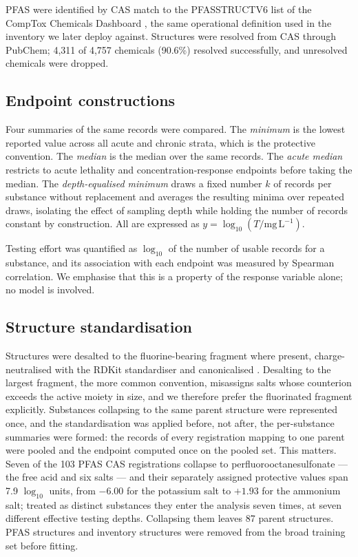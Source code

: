 \documentclass[preprint,12pt]{elsarticle}
\begin{document}
PFAS were identified by CAS match to the PFASSTRUCTV6 list of the CompTox
Chemicals Dashboard \cite{epacomptox2026}, the same operational definition used
in the inventory we later deploy against. Structures were resolved from CAS
through PubChem; 4{,}311 of 4{,}757 chemicals (90.6\%) resolved successfully,
and unresolved chemicals were dropped.

\subsection{Endpoint constructions}

Four summaries of the same records were compared. The \emph{minimum} is the
lowest reported value across all acute and chronic strata, which is the
protective convention. The \emph{median} is the median over the same records.
The \emph{acute median} restricts to acute lethality and concentration-response
endpoints before taking the median. The \emph{depth-equalised minimum} draws a
fixed number $k$ of records per substance without replacement and averages the
resulting minima over repeated draws, isolating the effect of sampling depth
while holding the number of records constant by construction. All are expressed
as $y=\log_{10}(T/\mathrm{mg\,L^{-1}})$.

Testing effort was quantified as $\log_{10}$ of the number of usable records for
a substance, and its association with each endpoint was measured by Spearman
correlation. We emphasise that this is a property of the response variable
alone; no model is involved.

\subsection{Structure standardisation}\label{sec:std}

Structures were desalted to the fluorine-bearing fragment where present,
charge-neutralised with the RDKit standardiser and canonicalised
\cite{rdkit,mceachran2018msready}. Desalting to the largest fragment, the more
common convention, misassigns salts whose counterion exceeds the active moiety
in size, and we therefore prefer the fluorinated fragment explicitly.
Substances collapsing to the same parent structure were represented once, and
the standardisation was applied before, not after, the per-substance summaries
were formed: the records of every registration mapping to one parent were
pooled and the endpoint computed once on the pooled set. This matters. Seven of the 103 PFAS CAS
registrations collapse to perfluorooctanesulfonate --- the free acid and six
salts --- and their separately assigned protective values span 7.9 $\log_{10}$
units, from $-6.00$ for the potassium salt to $+1.93$ for the ammonium salt;
treated as distinct substances they enter the analysis seven times, at seven
different effective testing depths. Collapsing them leaves 87
parent structures. PFAS structures and inventory structures were removed from
the broad training set before fitting.
\end{document}

